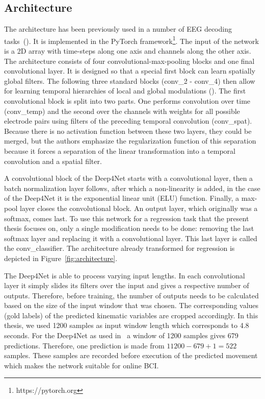 \subsection{Architecture}\label{subsec:architecture}
The architecture has been previously used in a number of EEG decoding tasks~(\cite{Hammer-2021, schirrmeister-deep-2017, hartmann-hierarchical-2018}).
It is implemented in the PyTorch framework\footnote{https://pytorch.org}.
The input of the network is a 2D array with time-steps along one axis and channels along the other axis.
The architecture consists of four convolutional-max-pooling blocks and one final convolutional layer.
It is designed so that a special first block can learn spatially global filters.
The following three standard blocks (conv\_2 - conv\_4) then allow for learning temporal hierarchies of local and global modulations (\cite{schirrmeister-deep-2017}).
The first convolutional block is split into two parts.
One performs convolution over time (conv\_temp) and the second over the channels with weights for all possible electrode pairs using filters of the preceding temporal convolution (conv\_spat).
Because there is no activation function between these two layers, they could be merged, but the authors emphasize the regularization function of this separation because it forces a separation of the linear transformation into a temporal convolution and a spatial filter.

A convolutional block of the Deep4Net starts with a convolutional layer, then a batch normalization layer follows, after which a non-linearity is added, in the case of the Deep4Net it is the exponential linear unit (ELU) function.
Finally, a max-pool layer closes the convolutional block.
An output layer, which originally was a softmax, comes last.
To use this network for a regression task that the present thesis focuses on, only a single modification needs to be done: removing the last softmax layer and replacing it with a convolutional layer.
This last layer is called the conv\_classifier.
The architecture already transformed for regression is depicted in Figure~\ref{fig:architecture}.

The Deep4Net is able to process varying input lengths.
In each convolutional layer it simply slides its filters over the input and gives a respective number of outputs.
Therefore, before training, the number of outputs needs to be calculated based on the size of the input window that was chosen.
The corresponding values (gold labels) of the predicted kinematic variables are cropped accordingly.
In this thesis, we used 1200 samples as input window length which corresponds to 4.8 seconds.
For the Deep4Net as used in~\cite{Hammer-2021} a window of 1200 samples gives 679 predictions.
Therefore, one prediction is made from $11200 - 679 + 1 = 522 $ samples.
These samples are recorded before execution of the predicted movement which makes the network suitable for online BCI.


